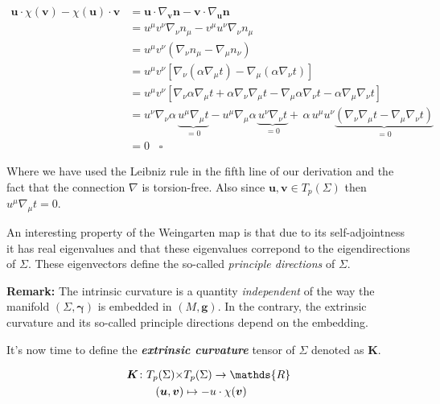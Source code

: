 \documentclass[12pt]{article}
\renewcommand{\vec}[1]{\bm{#1}}
\numberwithin{equation}{section}
\numberwithin{theorem}{subsection}
\begin{document}
\begin{align*}

    \vec{u} \cdot \chi(\vec{v}) - \chi(\vec{u}) \cdot \vec{v} &= \vec{u} \cdot \nabla_{\vec{v}}\vec{n} - \vec{v} \cdot \nabla_{\vec{u}}\vec{n} \\ 

    &= u^{\mu}v^{\nu}\nabla_{\nu}n_{\mu} - v^{\mu}u^{\nu}\nabla_{\nu}n_{\mu} \\

    &= u^{\mu}v^{\nu}(\nabla_{\nu}n_{\mu}-\nabla_{\mu}n_{\nu}) \\ &= u^{\mu}v^{\nu}[\nabla_{\nu}(\alpha \nabla_{\mu}t)-\nabla_{\mu}(\alpha \nabla_{\nu}t)] \\ &= u^{\mu}v^{\nu}[\nabla_{\nu}\alpha\nabla_{\mu}t+\alpha\nabla_{\nu}\nabla_{\mu}t-\nabla_{\mu}\alpha\nabla_{\nu}t-\alpha\nabla_{\mu}\nabla_{\nu}t] \\ &= u^{\nu}\nabla_{\nu} \alpha\, \underbrace{u^{\mu}\nabla_{\mu}t}_{=0} - u^{\mu}\nabla_{\mu}\alpha \,\underbrace{u^{\nu}\nabla_{\nu}t}_{=0} + \, \alpha \, u^{\mu}u^{\nu}\underbrace{(\nabla_{\nu}\nabla_{\mu}t-\nabla_{\mu}\nabla_{\nu}t)}_{= 0} \\ &= 0 \; \; \; \square

\end{align*}

Where we have used the Leibniz rule in the fifth line of our derivation and the fact that the connection $\nabla$ is torsion-free. Also since $\vec{u}, \vec{v} \in T_{p}(\Sigma)$ then $u^{\mu}\nabla_{\mu}t = 0$. 

\newline An interesting property of the Weingarten map is that due to its self-adjointness it has real eigenvalues and that these eigenvalues correpond to the eigendirections of $\Sigma$. These eigenvectors define the so-called \textit{principle directions} of $\Sigma$.

\smallskip

\newline \textbf{Remark:} The intrinsic curvature is a quantity \textit{independent} of the way the manifold $(\Sigma,\vec{\gamma})$ is embedded in $(M,\vec{g})$. In the contrary, the extrinsic curvature and its so-called principle directions depend on the embedding. \smallskip \newline

It's now time to define the \textbf{\textit{extrinsic curvature}} tensor of $\Sigma$ denoted as $\vec{K}$.

\begin{align}

    \vec{K} \colon T_{p}(\Sigma) \times &T_{p}(\Sigma) \to \mathds{R} \notag \\ 

    (\vec{u},\vec{v}) &\mapsto -u \cdot \chi(\vec{v})

\end{align}
\end{document}
